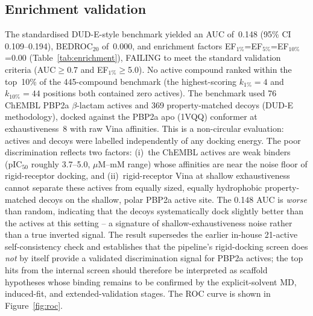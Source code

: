 \documentclass[12pt]{article}
\begin{document}
\subsection{Enrichment validation}
The standardised DUD-E-style benchmark yielded an AUC of~0.148 (95\% CI 0.109--0.194), BEDROC$_{20}$ of~0.000, and enrichment factors EF$_{1\%}$=EF$_{5\%}$=EF$_{10\%}$=0.00 (Table~\ref{tab:enrichment}), FAILING to meet the standard validation criteria (AUC$\ge$0.7 and EF$_{1\%}$$\ge$5.0). No active compound ranked within the top~10\% of the 445-compound benchmark (the highest-scoring $k_{1\%}=4$ and $k_{10\%}=44$ positions both contained zero actives). The benchmark used 76 ChEMBL PBP2a $\beta$-lactam actives and 369 property-matched decoys (DUD-E methodology), docked against the PBP2a apo (1VQQ) conformer at exhaustiveness~8 with raw Vina affinities. This is a non-circular evaluation: actives and decoys were labelled independently of any docking energy. The poor discrimination reflects two factors: (i)~the ChEMBL actives are weak binders (pIC$_{50}$ roughly 3.7--5.0, $\mu$M--mM range) whose affinities are near the noise floor of rigid-receptor docking, and (ii)~rigid-receptor Vina at shallow exhaustiveness cannot separate these actives from equally sized, equally hydrophobic property-matched decoys on the shallow, polar PBP2a active site. The 0.148 AUC is \emph{worse} than random, indicating that the decoys systematically dock slightly better than the actives at this setting -- a signature of shallow-exhaustiveness noise rather than a true inverted signal. The result supersedes the earlier in-house 21-active self-consistency check and establishes that the pipeline's rigid-docking screen does \emph{not} by itself provide a validated discrimination signal for PBP2a actives; the top hits from the internal screen should therefore be interpreted as scaffold hypotheses whose binding remains to be confirmed by the explicit-solvent MD, induced-fit, and extended-validation stages. The ROC curve is shown in Figure~\ref{fig:roc}.
\end{document}
